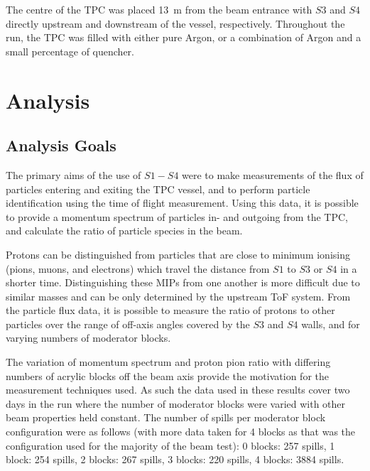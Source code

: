 The centre of the TPC was placed 13~m from the beam entrance with $S3$ and $S4$ directly upstream and downstream of the vessel, respectively. Throughout the run, the TPC was filled with either pure Argon, or a combination of Argon and a small percentage of quencher.



\section{Analysis}
\subsection{Analysis Goals}
The primary aims of the use of $S1 - S4$ were to make measurements of the flux of particles entering and exiting the TPC vessel, and to perform particle identification using the time of flight measurement.
Using this data, it is possible to provide a momentum spectrum of particles in- and outgoing from the TPC, and calculate the ratio of particle species in the beam.

Protons can be distinguished from particles that are close to minimum ionising (pions, muons, and electrons) which travel the distance from $S1$ to $S3$ or $S4$ in a shorter time.
Distinguishing these MIPs from one another is more difficult due to similar masses and can be only determined by the upstream ToF system.
From the particle flux data, it is possible to measure the ratio of protons to other particles over the range of off-axis angles covered by the $S3$ and $S4$ walls, and for varying numbers of moderator blocks.

The variation of momentum spectrum and proton pion ratio with differing numbers of acrylic blocks off the beam axis provide the motivation for the measurement techniques used.
As such the data used in these results cover two days in the run where the number of moderator blocks were varied with other beam properties held constant.
The number of spills per moderator block configuration were as follows (with more data taken for 4 blocks as that was the configuration used for the majority of the beam test):
0 blocks: 257 spills, 1 block:  254 spills, 2 blocks: 267 spills, 3 blocks: 220 spills, 4 blocks: 3884 spills.


